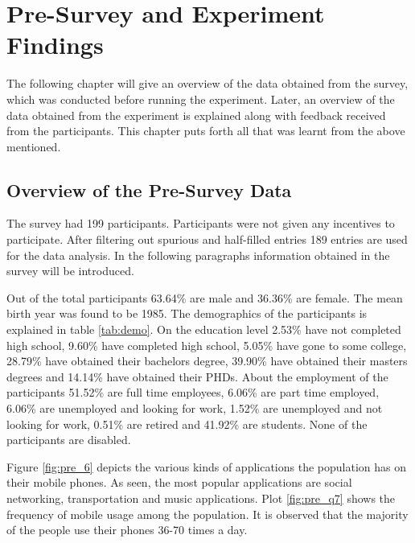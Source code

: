 \chapter{Pre-Survey and Experiment Findings}
The following chapter will give an overview of the data obtained from the survey, which was conducted before running the experiment.
Later, an overview of the data obtained from the experiment is explained along with feedback received from the participants. This chapter puts forth
all that was learnt from the above mentioned.

\section{Overview of the Pre-Survey Data}
The survey had 199 participants. Participants were not given any incentives to participate. After filtering out spurious and half-filled entries 189 entries are used for the data analysis. In the following paragraphs information obtained in the survey will be introduced.

Out of the total
participants 63.64\% are male and 36.36\% are female. The mean birth year was found to be 1985. The demographics of the participants is explained in table \ref{tab:demo}. On the education level 2.53\% have not completed high school, 9.60\% have completed high school, 5.05\% have gone to some college, 28.79\% have obtained their bachelors degree, 39.90\% have obtained their masters degrees and 14.14\% have obtained their PHDs. About the employment of the participants 51.52\% are full time employees, 6.06\% are part time employed, 6.06\% are unemployed and looking for work, 1.52\% are unemployed and not looking for work, 0.51\% are retired and 41.92\% are students. None of the participants are disabled. 

Figure \ref{fig:pre_6} depicts the various kinds of applications the population has on their mobile phones. As seen, the most popular applications are social networking, transportation and music applications. Plot \ref{fig:pre_q7} shows the frequency of mobile usage among the population. It is observed that the majority of the people use their phones 36-70 times a day.

